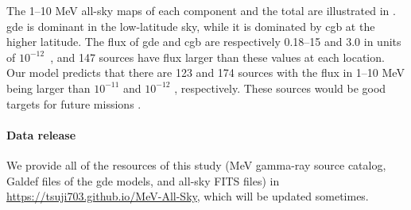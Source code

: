 \documentclass[a4paper,11pt]{article}
\begin{document}
The 1--10 MeV all-sky maps of each component and the total are illustrated in .
\ac{gde} is dominant in the low-latitude sky, while it is dominated by \ac{cgb} at the higher latitude.
The flux of \ac{gde} and \ac{cgb} are respectively 0.18--15 and 3.0 in units of $10^{-12}$~\flux,
and 147 sources have flux larger than these values at each location.
Our model predicts that there are 123 and 174 sources with the flux in 1--10 MeV being larger than $10^{-11}$ and $10^{-12}$ \flux, respectively.
These sources would be good targets for future missions \cite{COSI_SMEX,fleischhack_amego-x_2021,Aramaki2020,takada_first_2022}.








\paragraph{Data release}
We provide all of the resources of this study (MeV gamma-ray source catalog, Galdef files of the \ac{gde} models, and all-sky FITS files) in \url{https://tsuji703.github.io/MeV-All-Sky}, which will be updated sometimes.





\end{document}
